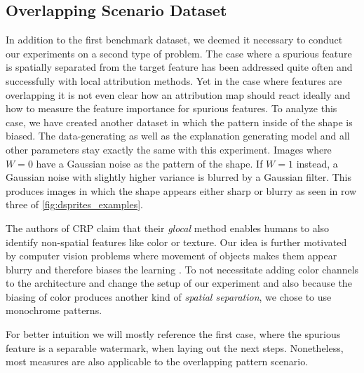\subsection{Overlapping Scenario Dataset}\label{section:dataset_overlap}
In addition to the first benchmark dataset, we deemed it necessary to conduct our experiments on a second type of problem.
The case where a spurious feature is spatially separated from the target feature has been addressed quite often and successfully with local attribution methods. Yet in the case where features are overlapping it is not even clear how an attribution map should react ideally and how to measure the feature importance for spurious features. To analyze this case, we have created another dataset in which the pattern inside of the shape is biased. The data-generating as well as the explanation generating model and all other parameters stay exactly the same with this experiment.
Images where $W=0$ have a Gaussian noise as the pattern of the shape. If $W=1$ instead, a Gaussian noise with slightly higher variance is blurred by a Gaussian filter. This produces images in which the shape appears either sharp or blurry as seen in row three of \cref{fig:dsprites_examples}. 

The authors of CRP claim that their \textit{glocal} method enables humans to also identify non-spatial features like color or texture. Our idea is further motivated by computer vision problems where movement of objects makes them appear blurry and therefore biases the learning \cite{?}.
To not necessitate adding color channels to the architecture and change the setup of our experiment and also because the biasing of color produces another kind of \textit{spatial separation}, we chose to use monochrome patterns.

For better intuition we will mostly reference the first case, where the spurious feature is a separable watermark, when laying out the next steps. Nonetheless, most measures are also applicable to the overlapping pattern scenario. 
